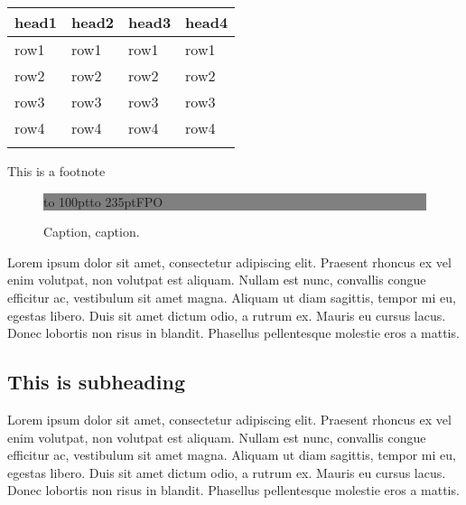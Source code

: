 \documentclass{bioinfo}
\begin{document}
\begin{methods}
\begin{table}[!t]
 {\begin{tabular}{@{}llll@{}}\toprule head1 &
head2 & head3 & head4\\\midrule
row1 & row1 & row1 & row1\\
row2 & row2 & row2 & row2\\
row3 & row3 & row3 & row3\\
row4 & row4 & row4 & row4\\\botrule
\end{tabular}}{This is a footnote}
\end{table}

\end{methods}

\begin{figure}[!tpb]%
\fboxsep=0pt\colorbox{gray}{\begin{minipage}[t]{235pt} \vbox to 100pt{\vfill\hbox to
235pt{\hfill\fontsize{24pt}{24pt}\selectfont FPO\hfill}\vfill}
\end{minipage}}
\caption{Caption, caption.}\label{fig:01}
\end{figure}


Lorem ipsum dolor sit amet, consectetur adipiscing elit. Praesent 
rhoncus ex vel enim volutpat, non volutpat est aliquam. Nullam est 
nunc, convallis congue efficitur ac, vestibulum sit amet magna. 
Aliquam ut diam sagittis, tempor mi eu, egestas libero. Duis sit 
amet dictum odio, a rutrum ex. Mauris eu cursus lacus. Donec 
lobortis non risus in blandit. Phasellus pellentesque molestie 
eros a mattis. 

\subsection{This is subheading}

Lorem ipsum dolor sit amet, consectetur adipiscing elit. Praesent 
rhoncus ex vel enim volutpat, non volutpat est aliquam. Nullam est 
nunc, convallis congue efficitur ac, vestibulum sit amet magna. 
Aliquam ut diam sagittis, tempor mi eu, egestas libero. Duis sit 
amet dictum odio, a rutrum ex. Mauris eu cursus lacus. Donec 
lobortis non risus in blandit. Phasellus pellentesque molestie 
eros a mattis. 
\end{document}
